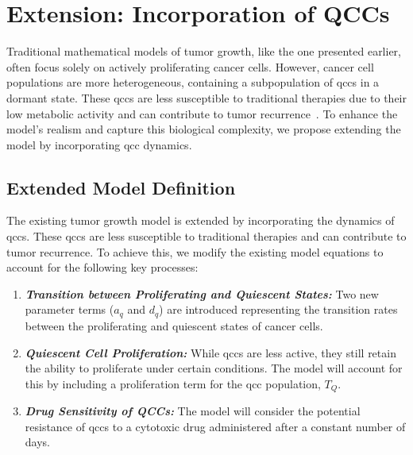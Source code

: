 \chapter{Extension: Incorporation of QCCs}

Traditional mathematical models of tumor growth, like the one presented earlier, often focus solely on actively proliferating cancer cells. However, cancer cell populations are more heterogeneous, containing a subpopulation of \gls{qcc}s in a dormant state. These \gls{qcc}s are less susceptible to traditional therapies due to their low metabolic activity and can contribute to tumor recurrence~\cite{davis_tumor_2019}. To enhance the model's realism and capture this biological complexity, we propose extending the model by incorporating \gls{qcc} dynamics.

\section{Extended Model Definition}

The existing tumor growth model is extended by incorporating the dynamics of \gls{qcc}s. These \gls{qcc}s are less susceptible to traditional therapies and can contribute to tumor recurrence. To achieve this, we modify the existing model equations to account for the following key processes:

\begin{enumerate}
    \item \textbf{\textit{Transition between Proliferating and Quiescent States:}} Two new parameter terms ($a_q$ and $d_q$) are introduced representing the transition rates between the proliferating and quiescent states of cancer cells.
    
    \item \textbf{\textit{Quiescent Cell Proliferation:}}  While \gls{qcc}s are less active, they still retain the ability to proliferate under certain conditions. The model will account for this by including a proliferation term for the \gls{qcc} population, $T_Q$.
    
    \item \textbf{\textit{Drug Sensitivity of QCCs:}} The model will consider the potential resistance of \gls{qcc}s to a cytotoxic drug administered after a constant number of days.
\end{enumerate}

